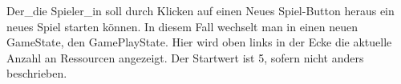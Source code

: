 Der\_die Spieler\_in soll durch Klicken auf einen \glqq{}Neues Spiel\grqq{}-Button heraus ein neues Spiel starten k\"onnen.
In diesem Fall wechselt man in einen neuen GameState, den GamePlayState. 
Hier wird oben links in der Ecke die aktuelle Anzahl an Ressourcen angezeigt.
Der Startwert ist 5, sofern nicht anders beschrieben.
